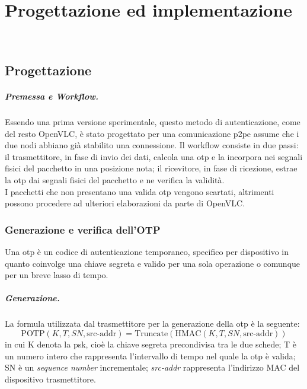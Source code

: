 \chapter{Progettazione ed implementazione}
\label{cap:progettazione}

\\

\section{Progettazione}

\paragraph{Premessa e Workflow.}
Essendo una prima versione sperimentale, questo metodo di autenticazione, come del resto OpenVLC, è stato progettato per una comunicazione \gls{p2p}\glsfirstoccur e assume che i due nodi abbiano già stabilito una connessione.
Il workflow consiste in due passi: il trasmettitore, in fase di invio dei dati, calcola una \gls{otp} e la incorpora nei segnali fisici del pacchetto in una posizione nota; il ricevitore, in fase di ricezione, estrae la \gls{otp} dai segnali fisici del pacchetto e ne verifica la validità.\\
I pacchetti che non presentano una valida \gls{otp} vengono scartati, altrimenti possono procedere ad ulteriori elaborazioni da parte di OpenVLC.


\subsection{Generazione e verifica dell'OTP}
Una \gls{otp} è un codice di autenticazione temporaneo, specifico per dispositivo in quanto coinvolge una chiave segreta e valido per una sola operazione o comunque per un breve lasso di tempo.

\paragraph{Generazione.}
La formula utilizzata dal trasmettitore per la generazione della \gls{otp} è la seguente:
\begin{equation}
    \text{POTP}(K, T, SN, \text{src-addr}) = \text{Truncate}\left( \text{HMAC}(K, T, SN, \text{src-addr}) \right)
    \label{eq:potp}
\end{equation}
in cui K denota la \gls{psk}, cioè la chiave segreta precondivisa tra le due schede; T è un numero intero che rappresenta l'intervallo di tempo nel quale la \gls{otp} è valida; SN è un \textit{sequence number} incrementale; \textit{src-addr} rappresenta l'indirizzo MAC del dispositivo trasmettitore.

